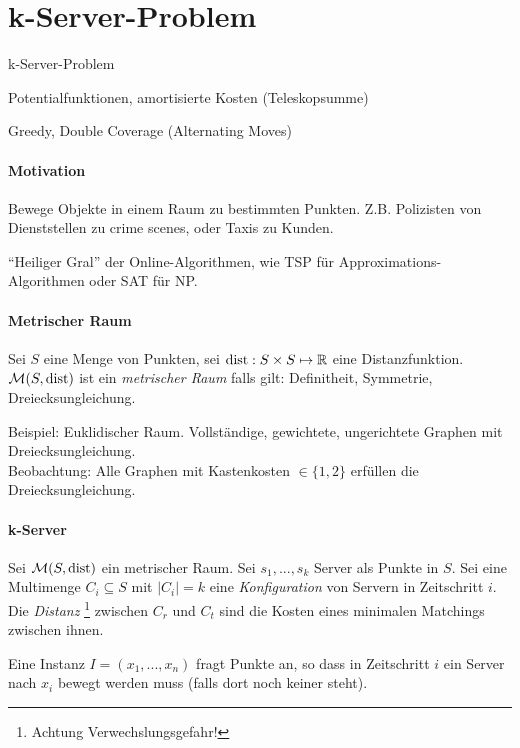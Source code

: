 \section{k-Server-Problem}

\begin{takeaway}
    \item k-Server-Problem
    \item Potentialfunktionen, amortisierte Kosten (Teleskopsumme)
    \item Greedy, Double Coverage (Alternating Moves)
\end{takeaway}

\paragraph{Motivation}
Bewege Objekte in einem Raum zu bestimmten Punkten.
Z.B. Polizisten von Dienststellen zu crime scenes, oder Taxis zu Kunden.

``Heiliger Gral'' der Online-Algorithmen, wie TSP für Approximations-Algorithmen oder SAT für NP.

\paragraph{Metrischer Raum}
Sei $S$ eine Menge von Punkten, sei $\text{dist} : S \times S \mapsto \mathbb{R}$ eine Distanzfunktion.
$\mathcal{M}(S, \text{dist})$ ist ein \emph{metrischer Raum} falls gilt:
Definitheit, Symmetrie, Dreiecksungleichung.

Beispiel: Euklidischer Raum. Vollständige, gewichtete, ungerichtete Graphen mit Dreiecksungleichung.
\\
Beobachtung: Alle Graphen mit Kastenkosten $\in \{1, 2\}$ erfüllen die Dreiecksungleichung.

\paragraph{k-Server}
Sei $\mathcal{M}(S, \text{dist})$ ein metrischer Raum.
Sei $s_1, ..., s_k$ Server als Punkte in $S$.
Sei eine Multimenge $C_i \subseteq S$ mit $|C_i|=k$ eine \emph{Konfiguration} von Servern in Zeitschritt $i$.
\\
Die \emph{Distanz} \footnote{Achtung Verwechslungsgefahr!}
zwischen $C_r$ und $C_t$ sind die Kosten eines minimalen Matchings zwischen ihnen.

Eine Instanz $I = (x_1, ..., x_n)$ fragt Punkte an, so dass in Zeitschritt $i$ ein Server nach $x_i$
bewegt werden muss (falls dort noch keiner steht).

